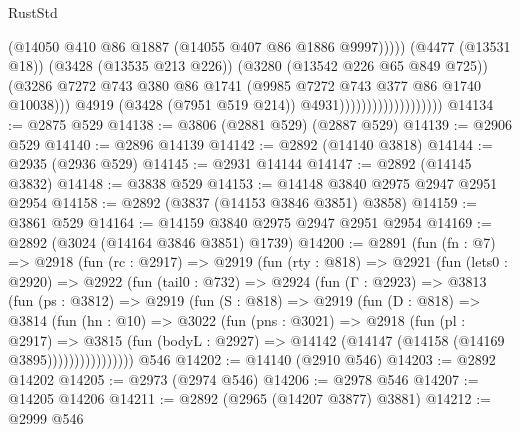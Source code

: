 \begin{lexlean}{RustStd}
\begin{coremodule}
                                                  (@14050
                                                    @410
                                                    @86
                                                    @1887
                                                    (@14055 @407 @86 @1886 @9997)))))
                                            (@4477 (@13531 @18))
                                            (@3428 (@13535 @213 @226))
                                            (@3280 (@13542 @226 @65 @849 @725))
                                            (@3286
                                              @7272
                                              @743
                                              @380
                                              @86
                                              @1741
                                              (@9985 @7272 @743 @377 @86 @1740 @10038)))
                                          @4919
                                          (@3428 (@7951 @519 @214))
                                          @4931)))))))))))))))))))
@14134 := @2875 @529
@14138 := @3806 (@2881 @529) (@2887 @529)
@14139 := @2906 @529
@14140 := @2896 @14139
@14142 := @2892 (@14140 @3818)
@14144 := @2935 (@2936 @529)
@14145 := @2931 @14144
@14147 := @2892 (@14145 @3832)
@14148 := @3838 @529
@14153 := @14148 @3840 @2975 @2947 @2951 @2954
@14158 := @2892 (@3837 (@14153 @3846 @3851) @3858)
@14159 := @3861 @529
@14164 := @14159 @3840 @2975 @2947 @2951 @2954
@14169 := @2892 (@3024 (@14164 @3846 @3851) @1739)
@14200 := @2891
    (fun (fn : @7) =>
    @2918
      (fun (rc : @2917) =>
      @2919
        (fun (rty : @818) =>
        @2921
          (fun (lets0 : @2920) =>
          @2922
            (fun (tail0 : @732) =>
            @2924
              (fun (Γ : @2923) =>
              @3813
                (fun (ps : @3812) =>
                @2919
                  (fun (S : @818) =>
                  @2919
                    (fun (D : @818) =>
                    @3814
                      (fun (hn : @10) =>
                      @3022
                        (fun (pns : @3021) =>
                        @2918
                          (fun (pl : @2917) =>
                          @3815
                            (fun (bodyL : @2927) =>
                            @14142 (@14147 (@14158 (@14169 @3895))))))))))))))))
    @546
@14202 := @14140 (@2910 @546)
@14203 := @2892 @14202
@14205 := @2973 (@2974 @546)
@14206 := @2978 @546
@14207 := @14205 @14206
@14211 := @2892 (@2965 (@14207 @3877) @3881)
@14212 := @2999 @546

\end{coremodule}
\end{lexlean}
